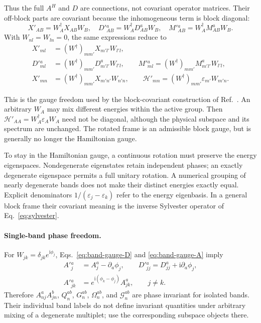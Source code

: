 \documentclass[prx,amsmath,amssymb,superscriptaddress,longbibliography]{revtex4-2}
\newcommand{\ii}{\mathrm{i}}
\begin{document}
Thus the full $A^H$ and $D$ are connections, not covariant operator matrices.
Their off-block parts are covariant because the inhomogeneous term is block diagonal:
\begin{equation}
 X'_{AB}=W_A^\dagger X_{AB}W_B,\quad
 D'{}^a_{AB}=W_A^\dagger D^a_{AB}W_B,\quad
 M'{}^a_{AB}=W_A^\dagger M^a_{AB}W_B.
 \label{eq:offblock-gauge}
\end{equation}
With $W_{nl}=W_{ln}=0$, the same expressions reduce to
\begin{align}
 X'_{ml}&=(W^\dagger)_{mm'}X_{m'l'}W_{l'l},\nonumber\\
 D'{}_{ml}^a&=(W^\dagger)_{mm'}D_{m'l'}^aW_{l'l},\qquad
 M'{}_{ml}^a=(W^\dagger)_{mm'}M_{m'l'}^aW_{l'l},\nonumber\\
 X'_{mn}&=(W^\dagger)_{mm'}X_{m'n'}W_{n'n},\qquad
 \mathcal H'_{mn}=(W^\dagger)_{mm'}\varepsilon_{m'}W_{m'n}.
 \label{eq:offblock-gauge-components}
\end{align}

This is the gauge freedom used by the block-covariant construction of
Ref.~\cite{Liu2023CovariantderivativesBerry}.
An arbitrary $W_A$ may mix different energies within the active group.
Then $\mathcal H'_{AA}=W_A^\dagger\varepsilon_A W_A$ need not be diagonal,
although the physical subspace and its spectrum are unchanged.
The rotated frame is an admissible block gauge, but is generally no longer
the Hamiltonian gauge.

To stay in the Hamiltonian gauge, a continuous rotation must preserve the
energy eigenspaces. Nondegenerate eigenstates retain independent phases;
an exactly degenerate eigenspace permits a full unitary rotation.
A numerical grouping of nearly degenerate bands does not make their distinct
energies exactly equal. Explicit denominators $1/(\varepsilon_j-\varepsilon_k)$
refer to the energy eigenbasis. In a general block frame their covariant
meaning is the inverse Sylvester operator of Eq.~\eqref{eq:sylvester}.

\paragraph{Single-band phase freedom.}
For $W_{jk}=\delta_{jk}e^{\ii\phi_j}$, Eqs.~\eqref{eq:band-gauge-D} and
\eqref{eq:band-gauge-A} imply
\begin{align}
 A'{}^a_j&=A_j^a-\partial_a\phi_j,\qquad
 D'{}^a_{jj}=D^a_{jj}+\ii\partial_a\phi_j,
 \label{eq:phase-diagonal}\\
 A'{}^a_{jk}&=e^{\ii(\phi_k-\phi_j)}A^a_{jk},\qquad j\ne k.
 \label{eq:phase-offdiagonal}
\end{align}
Therefore $A_{nj}^aA_{jn}^b$, $Q_n^{ab}$, $G_n^{ab}$,
$\Omega_n^{ab}$, and $\mathcal{G}_n^{ab}$ are phase invariant for isolated bands.
Their individual band labels do not define invariant quantities under
arbitrary mixing of a degenerate multiplet; use the corresponding subspace objects there.
\end{document}
